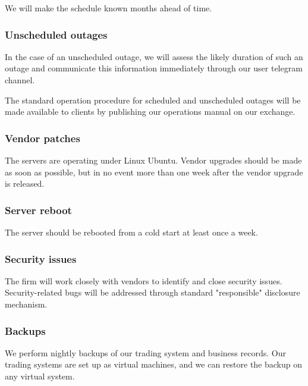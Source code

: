 We will make the schedule known months ahead of time.

\subsubsection{Unscheduled outages}
In the case of an unscheduled outage, we will assess the likely duration of
such an outage and communicate this information immediately through
our user telegram channel.

The standard operation procedure for scheduled and unscheduled outages
will be made available to clients by publishing our operations manual
on our exchange.

\subsubsection{Vendor patches}
The servers are operating under Linux Ubuntu.  Vendor upgrades should
be made as soon as possible, but in no event more than one week after
the vendor upgrade is released.

\subsubsection{Server reboot}
The server should be rebooted from a cold start at least once a week.

\subsubsection{Security issues}
The firm will work closely with vendors to identify and close security
issues.  Security-related bugs will be addressed through standard
"responsible" disclosure mechanism.

\subsubsection{Backups}
We perform nightly backups of our trading system and business
records.  Our trading systems are set up as virtual machines, and we can
restore the backup on any virtual system.


